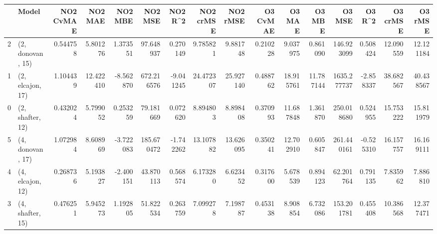 \begin{tabular}{llrrrrrrrrrrrrrr}
\toprule
{} &             Model &  NO2 CvMAE &    NO2 MAE &   NO2 MBE &     NO2 MSE &   NO2 R\textasciicircum2 &  NO2 crMSE &   NO2 rMSE &  O3 CvMAE &     O3 MAE &     O3 MBE &       O3 MSE &    O3 R\textasciicircum2 &   O3 crMSE &    O3 rMSE \\
\midrule
2 &  (2, donovan, 15) &   0.544758 &   5.801276 &  1.373551 &   97.648937 &  0.270149 &   9.785821 &   9.881748 &  0.210228 &   9.037975 &   0.861090 &   146.923099 &  0.508424 &  12.090559 &  12.121184 \\
1 &  (2, elcajon, 17) &   1.104439 &  12.422410 & -8.562870 &  672.216576 & -9.041245 &  24.472307 &  25.927140 &  0.488762 &  18.915761 &  11.787144 &  1635.277737 & -2.858337 &  38.682567 &  40.438567 \\
0 &  (2, shafter, 12) &   0.432024 &   5.799052 &  0.253259 &   79.181669 &  0.072620 &   8.894803 &   8.898408 &  0.370993 &  11.687848 &   1.361870 &   250.018680 &  0.524955 &  15.753222 &  15.811979 \\
5 &  (4, donovan, 17) &   1.072984 &   8.608969 & -3.722083 &  185.670472 & -1.742262 &  13.107882 &  13.626095 &  0.350241 &  12.702910 &   0.605847 &   261.440161 & -0.525310 &  16.157757 &  16.169111 \\
4 &  (4, elcajon, 12) &   0.268736 &   5.193827 & -2.400151 &   43.870113 &  0.568574 &   6.173280 &   6.623452 &  0.317600 &   5.678539 &   0.894123 &    62.201764 &  0.791135 &   7.835962 &   7.886810 \\
3 &  (4, shafter, 15) &   0.476251 &   5.945273 &  1.192805 &   51.822534 &  0.263759 &   7.099278 &   7.198787 &  0.453138 &   8.908854 &   6.732086 &   153.201781 &  0.455408 &  10.386568 &  12.377471 \\
\bottomrule
\end{tabular}
